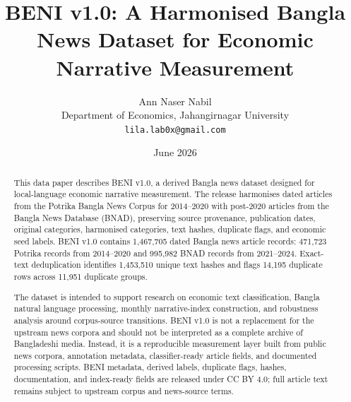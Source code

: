 \documentclass[11pt]{article}
\title{BENI v1.0: A Harmonised Bangla News Dataset for Economic Narrative Measurement}
\author{Ann Naser Nabil\\
Department of Economics, Jahangirnagar University\\
\texttt{lila.lab0x@gmail.com}}
\date{June 2026}
\begin{document}
\maketitle

\begin{center}
\end{center}

\begin{abstract}
This data paper describes BENI v1.0, a derived Bangla news dataset designed for local-language economic narrative measurement. The release harmonises dated articles from the Potrika Bangla News Corpus for 2014--2020 with post-2020 articles from the Bangla News Database (BNAD), preserving source provenance, publication dates, original categories, harmonised categories, text hashes, duplicate flags, and economic seed labels. BENI v1.0 contains 1,467,705 dated Bangla news article records: 471,723 Potrika records from 2014--2020 and 995,982 BNAD records from 2021--2024. Exact-text deduplication identifies 1,453,510 unique text hashes and flags 14,195 duplicate rows across 11,951 duplicate groups.

The dataset is intended to support research on economic text classification, Bangla natural language processing, monthly narrative-index construction, and robustness analysis around corpus-source transitions. BENI v1.0 is not a replacement for the upstream news corpora and should not be interpreted as a complete archive of Bangladeshi media. Instead, it is a reproducible measurement layer built from public news corpora, annotation metadata, classifier-ready article fields, and documented processing scripts. BENI metadata, derived labels, duplicate flags, hashes, documentation, and index-ready fields are released under CC BY 4.0; full article text remains subject to upstream corpus and news-source terms.
\end{abstract}
\end{document}
